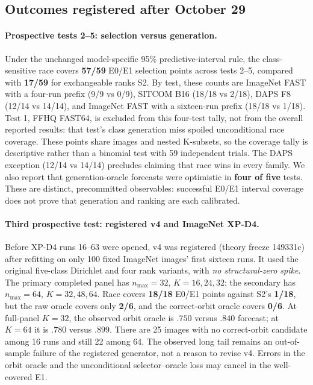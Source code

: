 \subsection{Outcomes registered after October 29}
\label{app:s3-post-registration-20261031}

\paragraph{Prospective tests 2--5: selection versus generation.}
Under the unchanged model-specific 95\% predictive-interval rule,
the class-sensitive race covers \textbf{57/59} E0/E1 selection
points across tests 2--5, compared with \textbf{17/59}
for exchangeable ranks S2. By test, these counts are ImageNet
FAST with a four-run prefix (9/9 vs 0/9), SITCOM B16
(18/18 vs 2/18), DAPS F8 (12/14 vs 14/14), and
ImageNet FAST with a sixteen-run prefix (18/18 vs 1/18).
Test 1, FFHQ FAST64, is excluded from this four-test tally,
not from the overall reported results: that test's class
generation miss spoiled unconditional race coverage.
These points share images and nested K-subsets, so the coverage tally
is descriptive rather than a binomial test with 59 independent trials.
The DAPS exception (12/14 vs 14/14) precludes claiming
that race wins in every family. We also report
that generation-oracle forecasts were optimistic in
\textbf{four of five} tests. These are distinct,
precommitted observables: successful E0/E1 interval coverage
does not prove that generation and ranking are each calibrated.

\paragraph{Third prospective test: registered v4 and ImageNet XP-D4.}
Before XP-D4 runs 16--63 were opened, v4 was registered
(theory freeze 149331c) after refitting on only
100 fixed ImageNet images' first sixteen runs.
It used the original five-class Dirichlet and four
rank variants, with \emph{no structural-zero spike}.
The primary completed panel has $n_{\max}=32$,
$K=16,24,32$; the secondary has $n_{\max}=64$,
$K=32,48,64$. Race covers \textbf{18/18} E0/E1
points against S2's \textbf{1/18}, but the raw oracle
covers only \textbf{2/6}, and the correct-orbit oracle
covers \textbf{0/6}. At full-panel $K=32$,
the observed orbit oracle is $.750$ versus $.840$
forecast; at $K=64$ it is $.780$ versus $.899$.
There are 25 images with no correct-orbit candidate
among 16 runs and still 22 among 64. The observed
long tail remains an out-of-sample failure of the
registered generator, not a reason to revise v4.
Errors in the orbit oracle and the unconditional
selector--oracle loss may cancel in the well-covered E1.

